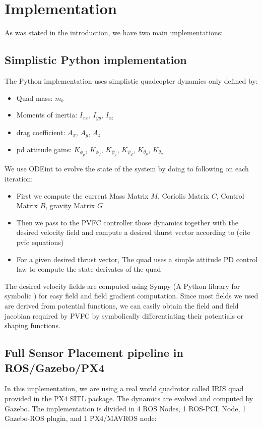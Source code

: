 \section{Implementation}
\label{Implementation section}
As was stated in the introduction, we have two main implementations: 
\subsection*{Simplistic Python implementation}
The Python implementation uses simplistic quadcopter dynamics only defined by:
\begin{itemize}
    \item Quad mass: $m_b$
    \item Moments of inertia: $I_{xx}$, $I_{yy}$, $I_{zz}$
    \item drag coefficient: $A_{x}$, $A_{y}$, $A_{z}$
    \item pd attitude gains: $K_{\phi_{p}}$, $K_{\phi_{d}}$, $K_{\psi_{p}}$, $K_{\psi_{d}}$, $K_{\theta_{p}}$, $K_{\theta_{d}}$
\end{itemize}

We use ODEint to evolve the state of the system by doing to following on each iteration: 
\begin{itemize}
    \item First we compute the current Mass Matrix $M$, Coriolis Matrix $C$, Control Matrix $B$, gravity Matrix $G$
    \item Then we pass to the PVFC controller those dynamics together with the desired velocity field and compute a desired thurst vector according to (cite pvfc equations)
    \item For a given desired thrust vector, The quad uses a simple attitude PD control law to compute the state derivates of the quad
\end{itemize}


The desired velocity fields are computed using Sympy (A Python library for symbolic ) for easy field and field gradient computation. Since most fields we used are derived from potential functions, we can easily obtain the field and field jacobian required by PVFC by symbolically differentiating their potentials or shaping functions.

\subsection*{Full Sensor Placement pipeline in ROS/Gazebo/PX4}
In this implementation, we are using a real world quadrotor called IRIS quad provided in the PX4 SITL package. 
The dynamics are evolved and computed by Gazebo. 
The implementation is divided in 4 ROS Nodes, 1 ROS-PCL Node, 1 Gazebo-ROS plugin, and 1 PX4/MAVROS node:


